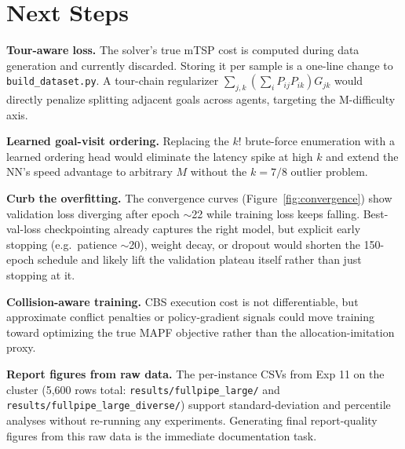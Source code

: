 \documentclass[11pt,a4paper]{article}
\begin{document}
\section{Next Steps}

\textbf{Tour-aware loss.} The solver's true mTSP cost is computed during data generation and
currently discarded. Storing it per sample is a one-line change to \texttt{build\_dataset.py}.
A tour-chain regularizer $\sum_{j,k}(\sum_i P_{ij}P_{ik})G_{jk}$ would directly penalize
splitting adjacent goals across agents, targeting the M-difficulty axis.

\textbf{Learned goal-visit ordering.} Replacing the $k!$ brute-force enumeration with a learned
ordering head would eliminate the latency spike at high $k$ and extend the NN's speed advantage
to arbitrary $M$ without the $k=7/8$ outlier problem.

\textbf{Curb the overfitting.} The convergence curves (Figure~\ref{fig:convergence}) show
validation loss diverging after epoch $\sim$22 while training loss keeps falling. Best-val-loss
checkpointing already captures the right model, but explicit early stopping (e.g.\ patience
$\sim$20), weight decay, or dropout would shorten the 150-epoch schedule and likely lift the
validation plateau itself rather than just stopping at it.

\textbf{Collision-aware training.} CBS execution cost is not differentiable, but approximate
conflict penalties or policy-gradient signals could move training toward optimizing the true
MAPF objective rather than the allocation-imitation proxy.

\textbf{Report figures from raw data.} The per-instance CSVs from Exp 11 on the cluster (5,600
rows total: \texttt{results/fullpipe\_large/} and \texttt{results/fullpipe\_large\_diverse/})
support standard-deviation and percentile analyses without re-running any experiments.
Generating final report-quality figures from this raw data is the immediate documentation task.
\end{document}
